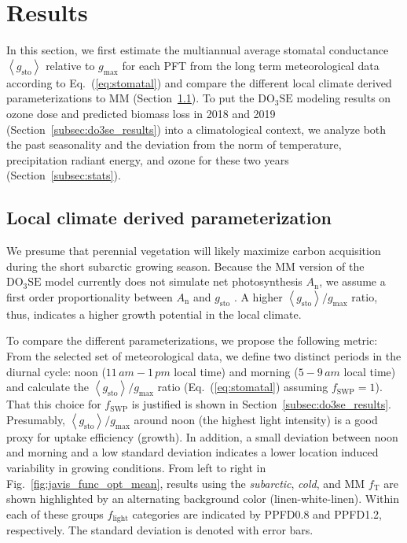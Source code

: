 \documentclass[bg, manuscript]{copernicus}
\begin{document}
\section{Results}
\label{sec:results}
In this section, we first estimate the multiannual average stomatal conductance $\left<g_\mathrm{sto}\right>$ relative to $g_\mathrm{max}$ for each PFT from the long term meteorological data according to Eq.~(\ref{eq:stomatal}) and compare the different local climate derived parameterizations to MM (Section~\ref{subsec:res_local}). To put the $\mathrm{DO_3SE}$ modeling results on ozone dose and predicted biomass loss in 2018 and 2019 (Section~\ref{subsec:do3se_results}) into a climatological context, we analyze both the past seasonality and the deviation from the norm of temperature, precipitation radiant energy, and ozone for these two years (Section~\ref{subsec:stats}).

\subsection{Local climate derived parameterization}
\label{subsec:res_local}

We presume that perennial vegetation will likely maximize carbon acquisition during the short subarctic growing season. Because the MM version of the $\mathrm{DO_3SE}$ model currently does not simulate net photosynthesis $A_\mathrm{n}$, we assume a first order proportionality between $A_\mathrm{n}$ and $g_\mathrm{sto}$ \citep{GCB:Medlyn2011}. A higher $\left<g_\mathrm{sto}\right>/g_\mathrm{max}$ ratio, thus, indicates a higher growth potential in the local climate.

To compare the different parameterizations, we propose the following metric: From the selected set of meteorological data, we define two distinct periods in the diurnal cycle: noon ($11\,\unit{am}-1\,\unit{pm}$ local time) and morning ($5-9\,\unit{am}$ local time) and calculate the $\left<g_\mathrm{sto}\right>/g_\mathrm{max}$ ratio (Eq.~(\ref{eq:stomatal}) assuming $f_\mathrm{SWP}=1$). That this choice for $f_\mathrm{SWP}$ is justified is shown in Section~\ref{subsec:do3se_results}. Presumably, $\left<g_\mathrm{sto}\right>/g_\mathrm{max}$ around noon (the highest light intensity) is a good proxy for  uptake efficiency (growth). In addition, a small deviation between noon and morning and a low standard deviation indicates a lower location induced variability in growing conditions. From left to right in Fig.~\ref{fig:javis_func_opt_mean}, results using the \emph{subarctic}, \emph{cold}, and MM $f_\mathrm{T}$ are shown highlighted by an alternating background color (linen-white-linen). Within each of these groups $f_\mathrm{light}$ categories are indicated by PPFD0.8 and PPFD1.2, respectively. The standard deviation is denoted with error bars. 
\end{document}
